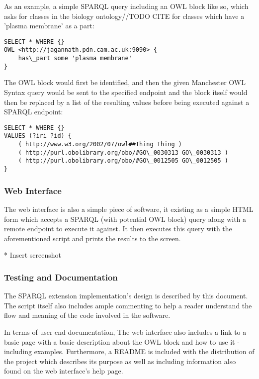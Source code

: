 \documentclass{article}
\begin{document}
As an example, a simple SPARQL query including an OWL block like so, which asks
for classes in the biology ontology//TODO CITE for classes which have a 'plasma
membrane' as a part:

\begin{lstlisting}
SELECT * WHERE {}
OWL <http://jagannath.pdn.cam.ac.uk:9090> {
    has\_part some 'plasma membrane'
}
\end{lstlisting}

The OWL block would first be identified, and then the given Manchester OWL
Syntax query would be sent to the specified endpoint and the block itself would
then be replaced by a list of the resulting values before being executed against
a SPARQL endpoint:

\begin{lstlisting}
SELECT * WHERE {} 
VALUES (?iri ?id) { 
    ( http://www.w3.org/2002/07/owl##Thing Thing ) 
    ( http://purl.obolibrary.org/obo/#GO\_0030313 GO\_0030313 ) 
    ( http://purl.obolibrary.org/obo/#GO\_0012505 GO\_0012505 ) 
}
\end{lstlisting}

\subsubsection{Web Interface}

The web interface is also a simple piece of software, it existing as a simple
HTML form which accepts a SPARQL (with potential OWL block) query along with a
remote endpoint to execute it against. It then executes this query with the
aforementioned script and prints the results to the screen.

* Insert screenshot

\subsubsection{Testing and Documentation}

The SPARQL extension implementation's design is described by this document. The
script itself also includes ample commenting to help a reader understand the
flow and meaning of the code involved in the software.

In terms of user-end documentation, The web interface also includes a link to a 
basic page with a basic description
about the OWL block and how to use it - including examples. Furthermore, a
README is included with the distribution of the project which describes its
purpose as well as including information also found on the web interface's help
page.
\end{document}
